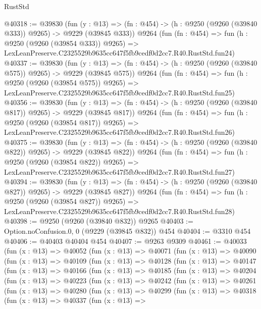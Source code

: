 \begin{lexlean}{RustStd}
\begin{coremodule}
@40318 := @39830
    (fun (y : @13) => (fn : @454) -> (h : @9250 (@9260 (@39840 @333)) @9265) -> @9229 (@39845 @333))
    @9264
    (fun (fn : @454) =>
    fun (h : @9250 (@9260 (@39854 @333)) @9265) =>
    LexLeanPreserve.C2325529b9635cc647f5fb9cedf0d2cc7.R40.RustStd.fun24)
@40337 := @39830
    (fun (y : @13) => (fn : @454) -> (h : @9250 (@9260 (@39840 @575)) @9265) -> @9229 (@39845 @575))
    @9264
    (fun (fn : @454) =>
    fun (h : @9250 (@9260 (@39854 @575)) @9265) =>
    LexLeanPreserve.C2325529b9635cc647f5fb9cedf0d2cc7.R40.RustStd.fun25)
@40356 := @39830
    (fun (y : @13) => (fn : @454) -> (h : @9250 (@9260 (@39840 @817)) @9265) -> @9229 (@39845 @817))
    @9264
    (fun (fn : @454) =>
    fun (h : @9250 (@9260 (@39854 @817)) @9265) =>
    LexLeanPreserve.C2325529b9635cc647f5fb9cedf0d2cc7.R40.RustStd.fun26)
@40375 := @39830
    (fun (y : @13) => (fn : @454) -> (h : @9250 (@9260 (@39840 @822)) @9265) -> @9229 (@39845 @822))
    @9264
    (fun (fn : @454) =>
    fun (h : @9250 (@9260 (@39854 @822)) @9265) =>
    LexLeanPreserve.C2325529b9635cc647f5fb9cedf0d2cc7.R40.RustStd.fun27)
@40394 := @39830
    (fun (y : @13) => (fn : @454) -> (h : @9250 (@9260 (@39840 @827)) @9265) -> @9229 (@39845 @827))
    @9264
    (fun (fn : @454) =>
    fun (h : @9250 (@9260 (@39854 @827)) @9265) =>
    LexLeanPreserve.C2325529b9635cc647f5fb9cedf0d2cc7.R40.RustStd.fun28)
@40398 := @9250 (@9260 (@39840 @832)) @9265
@40403 := Option.noConfusion.{0, 0} (@9229 (@39845 @832)) @454
@40404 := @3310 @454
@40406 := @40403 @40404 @454
@40407 := @9263 @9309
@40461 := @40033
    (fun (x : @13) =>
    @40052
      (fun (x : @13) =>
      @40071
        (fun (x : @13) =>
        @40090
          (fun (x : @13) =>
          @40109
            (fun (x : @13) =>
            @40128
              (fun (x : @13) =>
              @40147
                (fun (x : @13) =>
                @40166
                  (fun (x : @13) =>
                  @40185
                    (fun (x : @13) =>
                    @40204
                      (fun (x : @13) =>
                      @40223
                        (fun (x : @13) =>
                        @40242
                          (fun (x : @13) =>
                          @40261
                            (fun (x : @13) =>
                            @40280
                              (fun (x : @13) =>
                              @40299
                                (fun (x : @13) =>
                                @40318
                                  (fun (x : @13) =>
                                  @40337
                                    (fun (x : @13) =>

\end{coremodule}
\end{lexlean}
